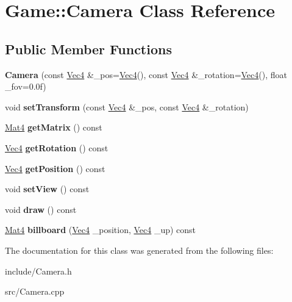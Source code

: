 \hypertarget{classGame_1_1Camera}{\section{Game\-:\-:Camera Class Reference}
\label{classGame_1_1Camera}
}
\subsection*{Public Member Functions}
\begin{DoxyCompactItemize}
\item 
\hypertarget{classGame_1_1Camera_a489fd7a8f774900e1350b44b2cefad82}{{\bfseries Camera} (const \hyperlink{classVec4}{Vec4} \&\-\_\-pos=\hyperlink{classVec4}{Vec4}(), const \hyperlink{classVec4}{Vec4} \&\-\_\-rotation=\hyperlink{classVec4}{Vec4}(), float \-\_\-fov=0.\-0f)}\label{classGame_1_1Camera_a489fd7a8f774900e1350b44b2cefad82}

\item 
\hypertarget{classGame_1_1Camera_ac15a355c746bd25693dbc8f568fde668}{void {\bfseries set\-Transform} (const \hyperlink{classVec4}{Vec4} \&\-\_\-pos, const \hyperlink{classVec4}{Vec4} \&\-\_\-rotation)}\label{classGame_1_1Camera_ac15a355c746bd25693dbc8f568fde668}

\item 
\hypertarget{classGame_1_1Camera_a8e0776f30e382a0f3bbe5dd0711b13f2}{\hyperlink{classMat4}{Mat4} {\bfseries get\-Matrix} () const }\label{classGame_1_1Camera_a8e0776f30e382a0f3bbe5dd0711b13f2}

\item 
\hypertarget{classGame_1_1Camera_ae771dbdf268662ba969e8a07d35ceddf}{\hyperlink{classVec4}{Vec4} {\bfseries get\-Rotation} () const }\label{classGame_1_1Camera_ae771dbdf268662ba969e8a07d35ceddf}

\item 
\hypertarget{classGame_1_1Camera_aca84b82412cc79266e04f9867d369ab6}{\hyperlink{classVec4}{Vec4} {\bfseries get\-Position} () const }\label{classGame_1_1Camera_aca84b82412cc79266e04f9867d369ab6}

\item 
\hypertarget{classGame_1_1Camera_acd7a530d32e00280245790f9c3b435a1}{void {\bfseries set\-View} () const }\label{classGame_1_1Camera_acd7a530d32e00280245790f9c3b435a1}

\item 
\hypertarget{classGame_1_1Camera_a6fbdab3974469ce633cab484a541a24a}{void {\bfseries draw} () const }\label{classGame_1_1Camera_a6fbdab3974469ce633cab484a541a24a}

\item 
\hypertarget{classGame_1_1Camera_a0ca413c6a8205394f48a04862e65a268}{\hyperlink{classMat4}{Mat4} {\bfseries billboard} (\hyperlink{classVec4}{Vec4} \-\_\-position, \hyperlink{classVec4}{Vec4} \-\_\-up) const }\label{classGame_1_1Camera_a0ca413c6a8205394f48a04862e65a268}

\end{DoxyCompactItemize}


The documentation for this class was generated from the following files\-:\begin{DoxyCompactItemize}
\item 
include/Camera.\-h\item 
src/Camera.\-cpp\end{DoxyCompactItemize}
